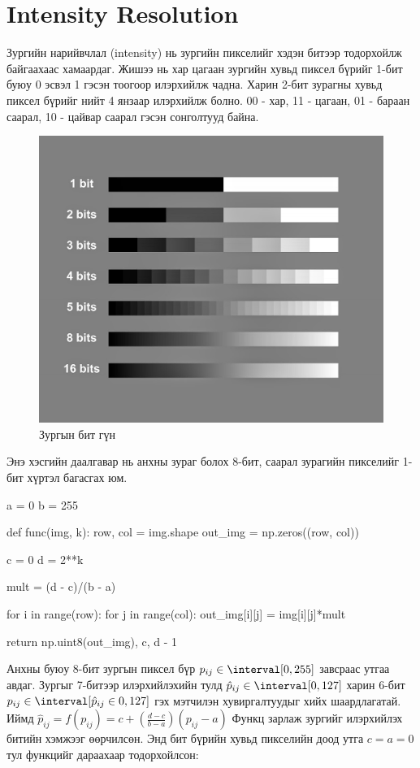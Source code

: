 \documentclass[a4paper]{article}
\begin{document}
\section{Intensity Resolution}
Зургийн нарийвчлал (intensity) нь зургийн пикселийг хэдэн битээр тодорхойлж байгаахаас хамаардаг. Жишээ нь хар цагаан зургийн хувьд пиксел бүрийг 1-бит буюу 0 эсвэл 1 гэсэн тоогоор илэрхийлж чадна. Харин 2-бит зурагны хувьд пиксел бүрийг нийт 4 янзаар илэрхийлж болно. 00 - хар, 11 - цагаан, 01 - бараан саарал, 10 - цайвар саарал гэсэн сонголтууд байна. 
\begin{figure}[H]
  \centering
  \includegraphics[scale = 0.20]{bitdepths_chart_med_1.jpg}
  \caption[Wider Face]{Зургын бит гүн \cite{bitdepth}}
\end{figure}
Энэ хэсгийн даалгавар нь анхны зураг болох 8-бит, саарал зурагийн пикселийг 1-бит хүртэл багасгах юм.
\begin{python}
a = 0
b = 255

def func(img, k):
    row, col = img.shape
    out_img = np.zeros((row, col))

    c = 0
    d = 2**k

    mult = (d - c)/(b - a)

    for i in range(row):
        for j in range(col):
            out_img[i][j] = img[i][j]*mult

    return np.uint8(out_img), c, d - 1
\end{python}
Анхны буюу 8-бит зургын пиксел бүр $p_{ij} \in \interval[{0, 255}]$ завсраас утгаа авдаг. Зургыг 7-битээр илэрхийлэхийн тулд $\hat{p}_{ij}\in\interval[{0, 127}]$ харин 6-бит $p_{ij} \in \interval[\hat{p}_{ij}\in{0, 127}]$ гэх мэтчилэн хувиргалтуудыг хийх шаардлагатай. Иймд $\hat{p}_{ij} = f(p_{ij}) = c + (\frac{d - c}{b - a})(p_{ij} - a)$ Функц зарлаж зургийг илэрхийлэх битийн хэмжээг өөрчилсөн. Энд бит бүрийн хувьд пикселийн доод утга $c = a = 0$ тул функцийг дараахаар тодорхойлсон:
\end{document}
